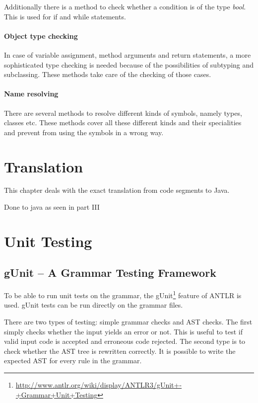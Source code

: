 Additionally there is a method to check whether a condition is of
the type \emph{bool}. This is used for if and while statements.

\paragraph{Object type checking}
In case of variable assignment, method arguments and return statements,
a more sophisticated type checking is needed because of the possibilities
of subtyping and subclassing. These methods take care of the checking
of those cases.

\paragraph{Name resolving}
There are several methods to resolve different kinds of symbols, namely
types, classes etc. These methods cover all these different kinds and their
specialities and prevent from using the symbols in a wrong way.

\section{Translation}
\label{ctr:translation}
This chapter deals with the exact translation from \ooplss code segments
to Java.

Done to java as seen in part III


\section{Unit Testing}
\subsection{gUnit -- A Grammar Testing Framework}

To be able to run unit tests on the grammar, the gUnit\footnote{
\href{http://www.antlr.org/wiki/display/ANTLR3/gUnit+-+Grammar+Unit+Testing}
{http://www.antlr.org/wiki/display/ANTLR3/gUnit+-+Grammar+Unit+Testing}}
feature of ANTLR is used. gUnit tests can be run directly on the grammar files.

There are two types of testing: simple grammar checks and AST checks. The 
first simply checks whether the input yields an error or not. This is useful
to test if valid input code is accepted and erroneous code rejected. The
second type is to check whether the AST tree is rewritten correctly. It is 
possible to write the expected AST for every rule in the grammar.\\

